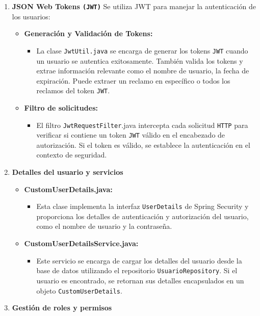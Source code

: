 \documentclass{article} %
\begin{document}
\begin{enumerate}
        \item \textbf{JSON Web Tokens \texttt{(JWT)}}
        \noindent Se utiliza JWT para manejar la autenticación de los usuarios:
        \begin{itemize}
            \item \textbf{Generación y Validación de Tokens:}
            \begin{itemize}
                \item La clase \texttt{JwtUtil.java} se encarga de generar los tokens \texttt{JWT} cuando un usuario se autentica exitosamente. También valida los tokens y extrae información relevante como el nombre de usuario, la fecha de expiración. Puede extraer un reclamo en específico o todos los reclamos del token \texttt{JWT}.
            \end{itemize}
            \item \textbf{Filtro de solicitudes:}
            \begin{itemize}
                \item El filtro \texttt{JwtRequestFilter}.java intercepta cada solicitud \texttt{HTTP} para verificar si contiene un token \texttt{JWT} válido en el encabezado de autorización. Si el token es válido, se establece la autenticación en el contexto de seguridad.
            \end{itemize}
        \end{itemize}
        
        \item \textbf{Detalles del usuario y servicios}
        \begin{itemize}
            \item \textbf{CustomUserDetails.java:}
            \begin{itemize}
                \item Esta clase implementa la interfaz \texttt{UserDetails} de Spring Security y proporciona los detalles de autenticación y autorización del usuario, como el nombre de usuario y la contraseña.
            \end{itemize}
            \item \textbf{CustomUserDetailsService.java:}
            \begin{itemize}
                \item Este servicio se encarga de cargar los detalles del usuario desde la base de datos utilizando el repositorio \texttt{UsuarioRepository}. Si el usuario es encontrado, se retornan sus detalles encapsulados en un objeto \texttt{CustomUserDetails}.
            \end{itemize}
        \end{itemize}
        
        \item \textbf{Gestión de roles y permisos}
    \end{enumerate}
    
\end{document}
